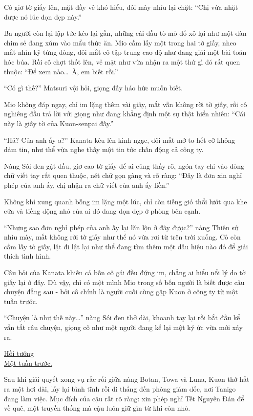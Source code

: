 \documentclass[../main.tex]{subfiles}
\begin{document}
Cô giơ tờ giấy lên, mặt đầy vẻ khó hiểu, đôi mày nhíu lại chặt: ``Chị vừa nhặt được nó lúc dọn dẹp này.''

Ba người còn lại lập tức kéo lại gần, những cái đầu tò mò đổ xô lại như một đàn chim sẻ đang xúm vào mẩu thức ăn. Mio cầm lấy một trong hai tờ giấy, nheo mắt nhìn kỹ từng dòng, đôi mắt cô tập trung cao độ như đang giải một bài toán hóc búa. Rồi cô chợt thốt lên, vẻ mặt như vừa nhận ra một thứ gì đó rất quen thuộc: ``Để xem nào\dots\ À, em biết rồi.''

``Có gì thế?'' Matsuri vội hỏi, giọng đầy háo hức muốn biết.

Mio không đáp ngay, chỉ im lặng thêm vài giây, mắt vẫn không rời tờ giấy, rồi cô nghiêng đầu trả lời với giọng như đang khẳng định một sự thật hiển nhiên: ``Cái này là giấy tờ của Kuon-senpai đấy.''

``Hả? Của anh ấy a?'' Kanata kêu lên kinh ngạc, đôi mắt mở to hết cỡ không dám tin, như thể vừa nghe thấy một tin tức chấn động cả công ty.

Nàng Sói đen gật đầu, giơ cao tờ giấy để ai cũng thấy rõ, ngón tay chỉ vào dòng chữ viết tay rất quen thuộc, nét chữ gọn gàng và rõ ràng: ``Đây là đơn xin nghỉ phép của anh ấy, chị nhận ra chữ viết của anh ấy liền.''

Không khí xung quanh bỗng im lặng một lúc, chỉ còn tiếng gió thổi lướt qua khe cửa và tiếng động nhỏ của ai đó đang dọn dẹp ở phòng bên cạnh.

``Nhưng sao đơn nghỉ phép của anh ấy lại lăn lộn ở đây được?'' nàng Thiên sứ nhíu mày, mắt không rời tờ giấy như thể nó vừa rơi từ trên trời xuống. Cô còn cầm lấy tờ giấy, lật đi lật lại như thể đang tìm thêm một dấu hiệu nào đó để giải thích tình hình.

Câu hỏi của Kanata khiến cả bốn cô gái đều đứng im, chẳng ai hiểu nổi lý do tờ giấy lại ở đây. Dù vậy, chỉ có một mình Mio trong số bốn người là biết được câu chuyện đằng sau - bởi cô chính là người cuối cùng gặp Kuon ở công ty từ một tuần trước.

``Chuyện là như thế này\dots'' nàng Sói đen thở dài, khoanh tay lại rồi bắt đầu kể vắn tắt câu chuyện, giọng cô như một người đang kể lại một ký ức vừa mới xảy ra.

\begin{center}
  \uline{Hồi tưởng\\Một tuần trước.}
\end{center}

Sau khi giải quyết xong vụ rắc rối giữa nàng Botan, Towa và Luna, Kuon thở hắt ra một hơi dài, lấy lại bình tĩnh rồi đi thẳng đến phòng giám đốc, nơi Tanigo đang làm việc. Mục đích của cậu rất rõ ràng: xin phép nghỉ Tết Nguyên Đán để về quê, một truyền thống mà cậu luôn giữ gìn từ khi còn nhỏ.
\end{document}
